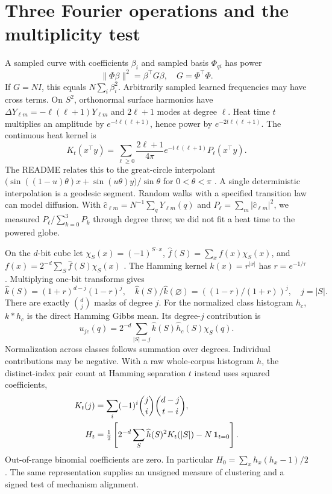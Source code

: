 \documentclass[11pt,a4paper]{article}
\begin{document}
\section{Three Fourier operations and the multiplicity test}
A sampled curve with coefficients $\beta_i$ and sampled basis $\Phi_{qi}$ has power
\begin{equation}
 \|\Phi\beta\|^2=\beta^\top G\beta,\quad G=\Phi^\top\Phi.
\end{equation}
If $G=NI$, this equals $N\sum_i\beta_i^2$. Arbitrarily sampled learned frequencies may have cross terms. On $S^2$, orthonormal surface harmonics have $\Delta Y_{\ell m}=-\ell(\ell+1)Y_{\ell m}$ and $2\ell+1$ modes at degree $\ell$. Heat time $t$ multiplies an amplitude by $e^{-t\ell(\ell+1)}$, hence power by $e^{-2t\ell(\ell+1)}$. The continuous heat kernel is
\[
 K_t(x^\top y)=\sum_{\ell\ge0}\frac{2\ell+1}{4\pi}
 e^{-t\ell(\ell+1)}P_\ell(x^\top y).
\]
The README relates this to the great-circle interpolant
$\big(\sin((1-u)\theta)x+\sin(u\theta)y\big)/\sin\theta$ for $0<\theta<\pi$ \citep{readme,shoemake}. A single deterministic interpolation is a geodesic segment. Random walks with a specified transition law can model diffusion. With $\hat c_{\ell m}=N^{-1}\sum_q Y_{\ell m}(q)$ and $P_\ell=\sum_m|\hat c_{\ell m}|^2$, we measured $P_\ell/\sum_{k=0}^3P_k$ through degree three; we did not fit a heat time to the powered globe.

On the $d$-bit cube let $\chi_S(x)=(-1)^{S\cdot x}$, $\widehat f(S)=\sum_x f(x)\chi_S(x)$, and $f(x)=2^{-d}\sum_S\widehat f(S)\chi_S(x)$ \citep{odonnell}. The Hamming kernel $k(x)=r^{|x|}$ has $r=e^{-1/\tau}$. Multiplying one-bit transforms gives
\begin{equation}
 \widehat k(S)=(1+r)^{d-j}(1-r)^j,\quad
 \widehat k(S)/\widehat k(\varnothing)=((1-r)/(1+r))^j,\quad j=|S|.\label{eq:walsh}
\end{equation}
There are exactly $\binom dj$ masks of degree $j$. For the normalized class histogram $h_c$, $k*h_c$ is the direct Hamming Gibbs mean. Its degree-$j$ contribution is
\begin{equation}
 u_{jc}(q)=2^{-d}\sum_{|S|=j}\widehat k(S)\widehat h_c(S)\chi_S(q).\label{eq:signed}
\end{equation}
Normalization across classes follows summation over degrees. Individual contributions may be negative. With a raw whole-corpus histogram $h$, the distinct-index pair count at Hamming separation $t$ instead uses squared coefficients,
\begin{align}
 K_t(j)&=\sum_i(-1)^i \binom ji\binom{d-j}{t-i},\\
 H_t&=\tfrac12\left[2^{-d}\sum_S\widehat h(S)^2K_t(|S|)-N\,{\bf1}_{t=0}\right].\label{eq:pairs}
\end{align}
Out-of-range binomial coefficients are zero. In particular $H_0=\sum_x h_x(h_x-1)/2$. The same representation supplies an unsigned measure of clustering and a signed test of mechanism alignment.
\end{document}
